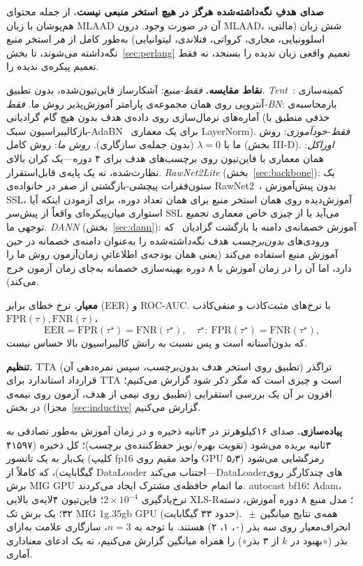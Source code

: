 \documentclass[a4paper,11pt]{article}
\begin{document}
\textbf{صدای هدفِ نگه‌داشته‌شده هرگز در هیچ استخر منبعی نیست}، از جمله محتوای
هم‌پوشان با زبان MLAAD آن در صورت وجود. درون MLAAD، شش زبان (مالتی،
اسلوونیایی، مجاری، کرواتی، فنلاندی، لیتوانیایی) به‌طور کامل از \emph{هر}
استخر منبع نگه‌داشته می‌شوند، تا بخش~\ref{sec:perlang} تعمیم واقعی زبان
ندیده را بسنجد، نه فقط تعمیم پیکره‌ی ندیده را.

\textbf{نقاط مقایسه.} \emph{فقط-منبع}: آشکارساز فاین‌تیون‌شده، بدون تطبیق.
\emph{Tent}~\cite{tent}: کمینه‌سازی آنتروپی روی همان مجموعه‌ی پارامتر
آموزش‌پذیر روش ما. \emph{فقط-BN}: بازمحاسبه‌ی آماره‌های نرمال‌سازی روی داده‌ی
هدف بدون هیچ گام گرادیانی (حذفی منطبق با بازکالیبراسیون سبک-AdaBN~\cite{adabn}
برای یک معماری LayerNorm). \emph{فقط-خودآموزی}: روش ما با $\lambda{=}0$
(بدون جمله‌ی سازگاری). \emph{روش ما}: روش کامل (بخش III-D). \emph{اوراکل}:
همان معماری با فاین‌تیون روی برچسب‌های هدف برای ۴ دوره---یک کران بالای
نظارت‌شده، نه یک پایه‌ی قابل‌استقرار. \emph{RawNet2Lite}
(بخش~\ref{sec:backbone}): یک ستون‌فقرات پیچشی-بازگشتی از صفر در خانواده‌ی
RawNet2~\cite{rawnet2}، بدون پیش‌آموزش SSL، آموزش‌دیده روی همان استخر منبع
برای همان تعداد دوره، برای آزمودن اینکه آیا استواری میان‌پیکره‌ای واقعاً از
پیش‌سر SSL می‌آید یا از چیزی خاص معماری تجمیع توجهی ما. \emph{DANN}
(بخش~\ref{sec:dann}): آموزش خصمانه‌ی دامنه با بازگشت گرادیان~\cite{dann}
که ورودی‌های \emph{بدون‌برچسب} هدف نگه‌داشته‌شده را به‌عنوان دامنه‌ی خصمانه
در حین آموزش منبع استفاده می‌کند (یعنی همان بودجه‌ی اطلاعاتیِ زمان‌آزمون
روش ما را دارد، اما آن را در زمان آموزش با ۸ دوره بهینه‌سازی خصمانه به‌جای
زمان آزمون خرج می‌کند).

\textbf{معیار.} نرخ خطای برابر (EER) و ROC-AUC. با نرخ‌های مثبت‌کاذب و
منفی‌کاذب $\mathrm{FPR}(\tau),\mathrm{FNR}(\tau)$،
\begin{equation}
\mathrm{EER}=\mathrm{FPR}(\tau^\star)=\mathrm{FNR}(\tau^\star),\quad
\tau^\star:\ \mathrm{FPR}(\tau^\star)=\mathrm{FNR}(\tau^\star),
\end{equation}
که بدون‌آستانه است و پس نسبت به رانش کالیبراسیون بالا حساس نیست.

\textbf{تنظیم.} TTA تراگذر (تطبیق روی استخر هدف بدون‌برچسب، سپس نمره‌دهی
آن) قرارداد استاندارد برای TTA است و چیزی است که مگر ذکر شود گزارش
می‌کنیم؛ افزون بر آن یک بررسی استقرایی (تطبیق روی نیمی از هدف، آزمون روی
نیمه‌ی مجزا) در بخش~\ref{sec:inductive} گزارش می‌کنیم.

\textbf{پیاده‌سازی.} صدای ۱۶کیلوهرتز در ۴ثانیه ذخیره و در زمان آموزش به‌طور
تصادفی به ۳ثانیه بریده می‌شود (تقویت بهره/نویز حفظ‌کننده‌ی برچسب)؛ کل
ذخیره (۴۱۵۹۷ کلیپ) یک‌بار به یک تانسور fp16 واحد مقیم روی GPU رمزگشایی
می‌شود (۵٫۳ گیگابایت)، که کاملاً از DataLoader اجتناب می‌کند---DataLoaderهای
چندکارگر روی برش MIG GPU ما اتمام حافظه‌ی مشترک ایجاد می‌کردند. autocast
bf16؛ Adam، نرخ‌یادگیری $2\times10^{-4}$؛ فاین‌تیون ۴لایه‌ی بالایی XLS-R؛
مدل منبع ۸ دوره آموزش، دسته ۳۲؛ یک برش تک MIG 1g.35gb GPU (حدود ۳۳
گیگابایت). همه‌ی نتایج میانگین$\,\pm\,$انحراف‌معیار روی سه بذر (۰، ۱، ۲)
هستند. با توجه به $n{=}3$، سازگاری علامت به‌ازای بذر («بهبود در $k$ از ۳
بذر») را همراه میانگین گزارش می‌کنیم، نه یک ادعای معناداری آماری.
\end{document}
